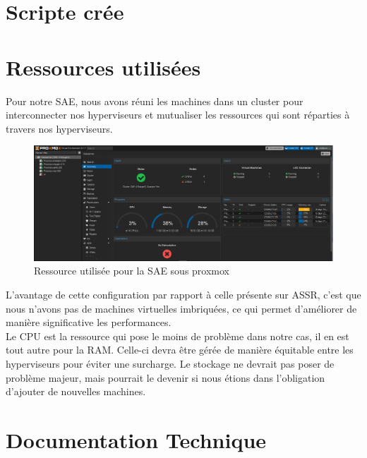 \documentclass{article}
\begin{document}


\newpage

\section{Scripte crée }



\newpage

\section{Ressources utilisées}

Pour notre SAE, nous avons réuni les machines dans un cluster pour interconnecter nos hyperviseurs et mutualiser les ressources qui sont réparties à travers nos hyperviseurs.

\begin{figure}[h]
    \centering
    \includegraphics[width=1\textwidth]{Images/Ressource.png}
    \caption{Ressource utilisée pour la SAE sous proxmox}
    \label{fig:solution1}
\end{figure}

L'avantage de cette configuration par rapport à celle présente sur ASSR, c'est que nous n'avons pas de machines virtuelles imbriquées, ce qui permet d'améliorer de manière significative les performances. \\
Le CPU est la ressource qui pose le moins de problème dans notre cas, il en est tout autre pour la RAM. Celle-ci devra être gérée de manière équitable entre les hyperviseurs pour éviter une surcharge. 
Le stockage ne devrait pas poser de problème majeur, mais pourrait le devenir si nous étions dans l'obligation d'ajouter de nouvelles machines.

\newpage

\section{Documentation Technique}


%
\end{document}
